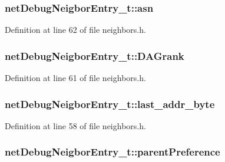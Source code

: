 \subsubsection[{\texorpdfstring{asn}{asn}}]{ net\+Debug\+Neigbor\+Entry\+\_\+t\+::asn}\hypertarget{structnet_debug_neigbor_entry__t_a165b554d93490830877a8866318aea04}{}\label{structnet_debug_neigbor_entry__t_a165b554d93490830877a8866318aea04}


Definition at line 62 of file neighbors.\+h.

\subsubsection[{\texorpdfstring{D\+A\+Grank}{DAGrank}}]{ net\+Debug\+Neigbor\+Entry\+\_\+t\+::\+D\+A\+Grank}\hypertarget{structnet_debug_neigbor_entry__t_a598ec07b40276860d689e9c792422881}{}\label{structnet_debug_neigbor_entry__t_a598ec07b40276860d689e9c792422881}


Definition at line 61 of file neighbors.\+h.

\subsubsection[{\texorpdfstring{last\+\_\+addr\+\_\+byte}{last_addr_byte}}]{ net\+Debug\+Neigbor\+Entry\+\_\+t\+::last\+\_\+addr\+\_\+byte}\hypertarget{structnet_debug_neigbor_entry__t_a40f416cf939cf5afff5a93f33f59a5c5}{}\label{structnet_debug_neigbor_entry__t_a40f416cf939cf5afff5a93f33f59a5c5}


Definition at line 58 of file neighbors.\+h.

\subsubsection[{\texorpdfstring{parent\+Preference}{parentPreference}}]{ net\+Debug\+Neigbor\+Entry\+\_\+t\+::parent\+Preference}\hypertarget{structnet_debug_neigbor_entry__t_a091ad78edf8df0476cbf0cd40628b1b1}{}\label{structnet_debug_neigbor_entry__t_a091ad78edf8df0476cbf0cd40628b1b1}


